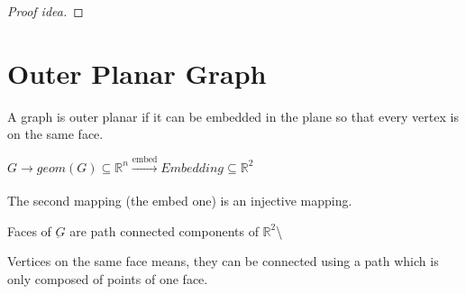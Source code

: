 \documentclass{article}
\def\R{\mathbb{R}}
\begin{document}
\begin{proof}[Proof idea]
%    
%    
%    
%    
%    
%    
%    
\end{proof}


\section{Outer Planar Graph}
\begin{definition}
A graph is outer planar if it can be embedded in the plane so that every vertex is on the same face.

${G \rightarrow geom (G) \subseteq {\R^n} \xrightarrow[\text{}]{\text{embed}} Embedding  \subseteq {\R^2}}$

The second mapping (the embed one) is an injective mapping.

\end{definition}


\begin{definition}
Faces of $\underbar{G}$ are path connected components of ${\R^2}$\textbackslash{} 
\end{definition}

\begin{definition}
    Vertices on the same face means, they can be connected using a path which is only composed of points of one face.
\end{definition}
\end{document}
